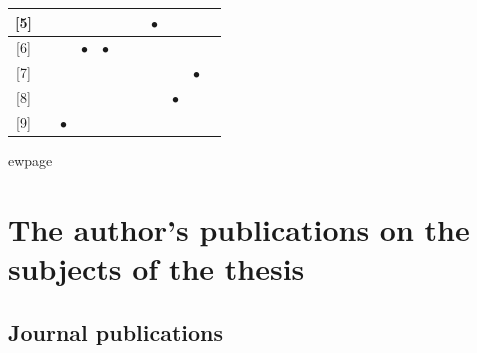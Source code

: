 \documentclass[12pt,a4paper]{extarticle}
\begin{document}
\begin{table}[h!]
\begin{tabular}{|c|c|c|c|c|c|c|c|c|c|c|}
{[}5{]}                               & \multicolumn{1}{c|}{}          & \multicolumn{1}{c|}{}          & \multicolumn{1}{c|}{}          & \multicolumn{1}{c|}{}          & \multicolumn{1}{c|}{}          & \multicolumn{1}{c|}{}          & \multicolumn{1}{c|}{$\bullet$} & \multicolumn{1}{c|}{}          &           \\ \hline
{[}6{]}                               & \multicolumn{1}{c|}{}          & \multicolumn{1}{c|}{}          & \multicolumn{1}{c|}{$\bullet$} & \multicolumn{1}{c|}{$\bullet$} & \multicolumn{1}{c|}{}          & \multicolumn{1}{c|}{}          & \multicolumn{1}{c|}{}          & \multicolumn{1}{c|}{}          &           \\ \hline
{[}7{]}                               & \multicolumn{1}{c|}{}          & \multicolumn{1}{c|}{}          & \multicolumn{1}{c|}{}          & \multicolumn{1}{c|}{}          & \multicolumn{1}{c|}{}          & \multicolumn{1}{c|}{}          & \multicolumn{1}{c|}{}          & \multicolumn{1}{c|}{}          & $\bullet$ \\ \hline
{[}8{]}                               & \multicolumn{1}{c|}{}          & \multicolumn{1}{c|}{}          & \multicolumn{1}{c|}{}          & \multicolumn{1}{c|}{}          & \multicolumn{1}{c|}{}          & \multicolumn{1}{c|}{}          & \multicolumn{1}{c|}{}          & \multicolumn{1}{c|}{$\bullet$} &           \\ \hline
{[}9{]}                               & \multicolumn{1}{c|}{}          & \multicolumn{1}{c|}{$\bullet$} & \multicolumn{1}{c|}{}          & \multicolumn{1}{c|}{}          & \multicolumn{1}{c|}{}          & \multicolumn{1}{c|}{}          & \multicolumn{1}{c|}{}          & \multicolumn{1}{c|}{}          &           \\ \hline
\end{tabular}
\end{table}


ewpage
\section*{The author’s publications on the subjects of the thesis}

\vspace*{1em}

\subsection*{Journal publications}
\end{document}
